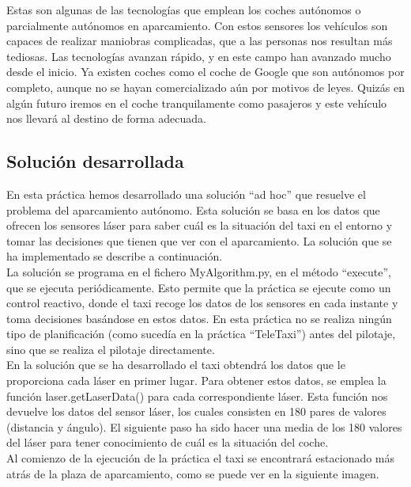 Estas son algunas de las tecnologías que emplean los coches autónomos o parcialmente autónomos en aparcamiento. Con estos sensores los vehículos son capaces de realizar maniobras complicadas, que a las personas nos resultan más tediosas. Las tecnologías avanzan rápido, y en este campo han avanzado mucho desde el inicio. Ya existen coches como el coche de Google que son autónomos por completo, aunque no se hayan comercializado aún por motivos de leyes. Quizás en algún futuro iremos en el coche tranquilamente como pasajeros y este vehículo nos llevará al destino de forma adecuada.

\subsection{Solución desarrollada}
En esta práctica hemos desarrollado una solución ``ad hoc'' que resuelve el problema del aparcamiento autónomo. Esta solución se basa en los datos que ofrecen los sensores láser para saber cuál es la situación del taxi en el entorno y tomar las decisiones que tienen que ver con el aparcamiento. La solución que se ha implementado se describe a continuación.\\

La solución se programa en el fichero MyAlgorithm.py, en el método ``execute'', que se ejecuta periódicamente. Esto permite que la práctica se ejecute como un control reactivo, donde el taxi recoge los datos de los sensores en cada instante y toma decisiones basándose en estos datos. En esta práctica no se realiza ningún tipo de planificación (como sucedía en la práctica ``TeleTaxi'') antes del pilotaje, sino que se realiza el pilotaje directamente.\\


En la solución que se ha desarrollado el taxi obtendrá los datos que le proporciona cada láser en primer lugar. Para obtener estos datos, se emplea la función laser.getLaserData() para cada correspondiente láser. Esta función nos devuelve los datos del sensor láser, los cuales consisten en 180 pares de valores (distancia y ángulo). El siguiente paso ha sido hacer una media de los 180 valores del láser para tener conocimiento de cuál es la situación del coche. \\

Al comienzo de la ejecución de la práctica el taxi se encontrará estacionado más atrás de la plaza de aparcamiento, como se puede ver en la siguiente imagen.

